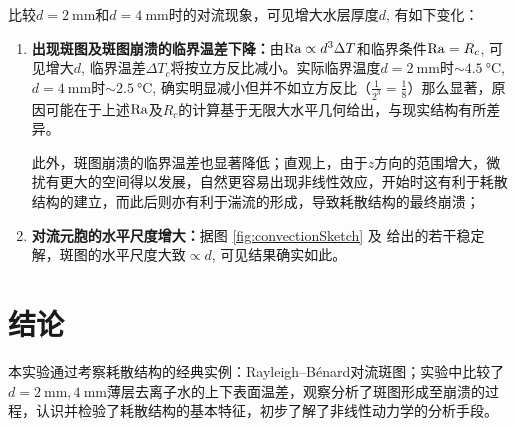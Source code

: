 \documentclass[aps,pre,12pt,preprint,%
	onecolumn,showpacs,showkeys,nofootinbib]{revtex4-1}
\newcommand{\rayleighNumber}{\mrm{Ra}}
\begin{document}
	比较$d = \SI{2}{\mm}$和$d = \SI{4}{\mm}$时的对流现象，可见增大水层厚度$d$, 有如下变化：
	\begin{enumerate}[listparindent=\parindent]
	\item \textbf{出现斑图及斑图崩溃的临界温差下降：}由$\rayleighNumber \propto d^3\Delta T$和临界条件$\rayleighNumber = R_c$, 可见增大$d$, 临界温差$\Delta T_c$将按立方反比减小。实际临界温度$d = \SI{2}{\mm}$时$\sim\SI{4.5}{\celsius}$, $d = \SI{4}{\mm}$时$\sim\SI{2.5}{\celsius}$, 确实明显减小但并不如立方反比（$\frac{1}{2^3} = \frac{1}{8}$）那么显著，原因可能在于上述$\rayleighNumber$及$R_c$的计算基于无限大水平几何给出，与现实结构有所差异。
	
	此外，斑图崩溃的临界温差也显著降低；直观上，由于$z$方向的范围增大，微扰有更大的空间得以发展，自然更容易出现非线性效应，开始时这有利于耗散结构的建立，而此后则亦有利于湍流的形成，导致耗散结构的最终崩溃；
	\item \textbf{对流元胞的水平尺度增大：}据图 \ref{fig:convectionSketch} 及 \cite{textbook} 给出的若干稳定解，斑图的水平尺度大致$\propto d$, 可见结果确实如此。
	\end{enumerate}
%
\vspace{-.8\baselineskip}
\section{结论}
\vspace{-.5\baselineskip}
	本实验通过考察耗散结构的经典实例：Rayleigh–Bénard对流斑图；实验中比较了$d = \SI{2}{\mm}, \SI{4}{\mm}$薄层去离子水的上下表面温差，观察分析了斑图形成至崩溃的过程，认识并检验了耗散结构的基本特征，初步了解了非线性动力学的分析手段。
\vspace{-.8\baselineskip}
\end{document}
